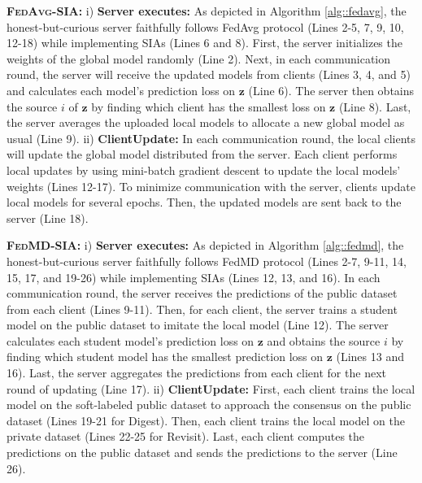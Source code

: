 \documentclass[10pt,journal,compsoc]{IEEEtran}
\newcommand*\fedavg{\textsc{FedAvg-SIA}}
\newcommand*\fedmd{\textsc{FedMD-SIA}}
\begin{document}
\noindent \textbf{\fedavg: \;} i) \textbf{Server executes:} As depicted in Algorithm \ref{alg::fedavg}, the honest-but-curious server faithfully follows FedAvg protocol (Lines 2-5, 7, 9, 10, 12-18) while implementing SIAs (Lines 6 and 8). First, the server initializes the weights of the global model randomly (Line 2). Next, in each communication round, the server will receive the updated models from clients (Lines 3, 4, and 5) and calculates each model's prediction loss on $\bm{z}$ (Line 6). The server then obtains the source $i$ of $\bm{z}$ by finding which client has the smallest loss on $\bm{z}$ (Line 8). Last, the server averages the uploaded local models to allocate a new global model as usual (Line 9). ii) \textbf{ClientUpdate:} In each communication round, the local clients will update the global model distributed from the server. Each client performs local updates by using mini-batch gradient descent to update the local models' weights (Lines 12-17). To minimize communication with the server, clients update local models for several epochs. Then, the updated models are sent back to the server (Line 18).


\noindent \textbf{\fedmd: \;} i) \textbf{Server executes:} As depicted in Algorithm \ref{alg::fedmd}, the honest-but-curious server faithfully follows FedMD protocol (Lines 2-7, 9-11, 14, 15, 17, and 19-26) while implementing SIAs (Lines 12, 13, and 16). In each communication round, the server receives the predictions of the public dataset from each client (Lines 9-11). Then, for each client, the server trains a student model on the public dataset to imitate the local model (Line 12). The server calculates each student model's prediction loss on $\bm{z}$ and obtains the source $i$ by finding which student model has the smallest prediction loss on $\bm{z}$ (Lines 13 and 16). Last, the server aggregates the predictions from each client for the next round of updating (Line 17). ii) \textbf{ClientUpdate:} First, each client trains the local model on the soft-labeled public dataset to approach the consensus on the public dataset (Lines 19-21 for Digest). Then, each client trains the local model on the private dataset (Lines 22-25 for Revisit). Last, each client computes the predictions on the public dataset and sends the predictions to the server (Line 26).
\end{document}
